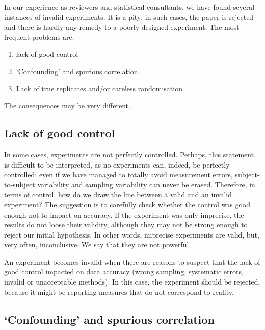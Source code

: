 \documentclass[a4paper,12pt,oneside]{book}
\providecommand{\tightlist}{%
  \setlength{\itemsep}{0pt}\setlength{\parskip}{0pt}}
\begin{document}
In our experience as reviewers and statistical consultants, we have found several instances of invalid experiments. It is a pity: in such cases, the paper is rejected and there is hardly any remedy to a poorly designed experiment. The most frequent problems are:

\begin{enumerate}
\def\labelenumi{\arabic{enumi}.}
\tightlist
\item
  lack of good control
\item
  `Confounding' and spurious correlation
\item
  Lack of true replicates and/or careless randomisation
\end{enumerate}

The consequences may be very different.

\hypertarget{lack-of-good-control}{%
\subsection{Lack of good control}\label{lack-of-good-control}}

In some cases, experiments are not perfectly controlled. Perhaps, this statement is difficult to be interpreted, as no experiments can, indeed, be perfectly controlled: even if we have managed to totally avoid measurement errors, subject-to-subject variability and sampling variability can never be erased. Therefore, in terms of control, how do we draw the line between a valid and an invalid experiment? The suggestion is to carefully check whether the control was good enough not to impact on accuracy. If the experiment was only imprecise, the results do not loose their validity, although they may not be strong enough to reject our initial hypothesis. In other words, imprecise experiments are valid, but, very often, inconclusive. We say that they are not powerful.

An experiment becomes invalid when there are reasons to suspect that the lack of good control impacted on data accuracy (wrong sampling, systematic errors, invalid or unacceptable methods). In this case, the experiment should be rejected, because it might be reporting measures that do not correspond to reality.

\hypertarget{confounding-and-spurious-correlation}{%
\subsection{`Confounding' and spurious correlation}\label{confounding-and-spurious-correlation}}
\end{document}
